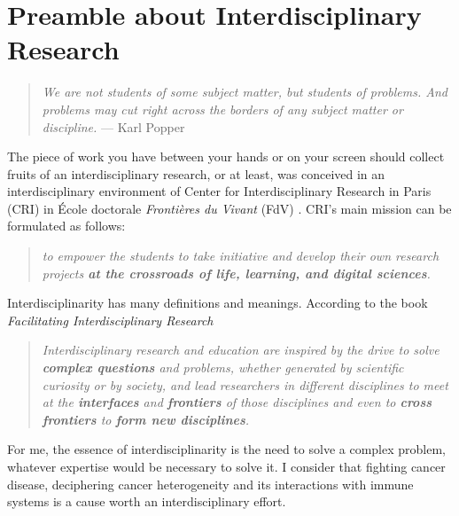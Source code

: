 \documentclass[12pt,]{book}
\theoremstyle{definition}
\theoremstyle{definition}
\theoremstyle{definition}
\theoremstyle{remark}
\begin{document}
{
\hypersetup{linkcolor=black}
\setcounter{tocdepth}{4}
\tableofcontents
}
\hypersetup{linkcolor=black}
\listoftables

\hypersetup{linkcolor=black}
\listoffigures
\hypertarget{preamble-about-interdisciplinary-research}{%
\chapter*{Preamble about Interdisciplinary
Research}\label{preamble-about-interdisciplinary-research}}

\setcounter{page}{15}

\begin{quote}
\emph{We are not students of some subject matter, but students of
problems. And problems may cut right across the borders of any subject
matter or discipline.} --- Karl Popper
\end{quote}

The piece of work you have between your hands or on your screen should
collect fruits of an interdisciplinary research, or at least, was
conceived in an interdisciplinary environment of Center for
Interdisciplinary Research in Paris (CRI) in École doctorale
\emph{Frontières du Vivant} (FdV) . CRI's main mission can be formulated
as follows:

\begin{quote}
\emph{to empower the students to take initiative and develop their own
research projects \textbf{at the crossroads of life, learning, and
digital sciences}.} \citep{CRIweb}
\end{quote}

Interdisciplinarity has many definitions and meanings. According to the
book \emph{Facilitating Interdisciplinary Research} \citep{FIRbook}

\begin{quote}
\emph{Interdisciplinary research and education are inspired by the drive
to solve \textbf{complex questions} and problems, whether generated by
scientific curiosity or by society, and lead researchers in different
disciplines to meet at the \textbf{interfaces} and \textbf{frontiers} of
those disciplines and even to \textbf{cross frontiers} to \textbf{form
new disciplines}.}
\end{quote}

For me, the essence of interdisciplinarity is the need to solve a
complex problem, whatever expertise would be necessary to solve it. I
consider that fighting cancer disease, deciphering cancer heterogeneity
and its interactions with immune systems is a cause worth an
interdisciplinary effort.
\end{document}
